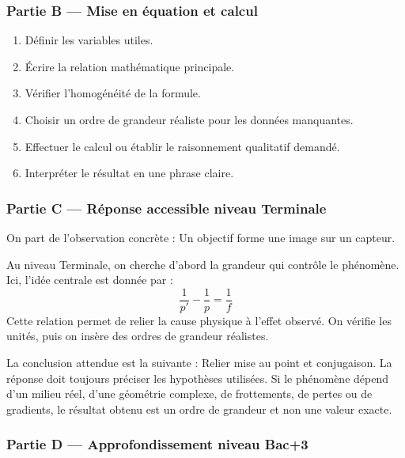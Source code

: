 \documentclass[11pt,a4paper]{article}
\begin{document}
\subsubsection*{Partie B — Mise en équation et calcul}

\begin{enumerate}
  \item Définir les variables utiles.
  \item Écrire la relation mathématique principale.
  \item Vérifier l'homogénéité de la formule.
  \item Choisir un ordre de grandeur réaliste pour les données manquantes.
  \item Effectuer le calcul ou établir le raisonnement qualitatif demandé.
  \item Interpréter le résultat en une phrase claire.
\end{enumerate}

\subsubsection*{Partie C — Réponse accessible niveau Terminale}

\begin{corrigebox}
On part de l'observation concrète : Un objectif forme une image sur un capteur.

Au niveau Terminale, on cherche d'abord la grandeur qui contrôle le phénomène. Ici, l'idée centrale est donnée par :
\[
\frac1{p'}-\frac1p=\frac1f
\]
Cette relation permet de relier la cause physique à l'effet observé. On vérifie les unités, puis on insère des ordres de grandeur réalistes.

La conclusion attendue est la suivante : Relier mise au point et conjugaison. La réponse doit toujours préciser les hypothèses utilisées. Si le phénomène dépend d'un milieu réel, d'une géométrie complexe, de frottements, de pertes ou de gradients, le résultat obtenu est un ordre de grandeur et non une valeur exacte.
\end{corrigebox}

\subsubsection*{Partie D — Approfondissement niveau Bac+3}
\end{document}
